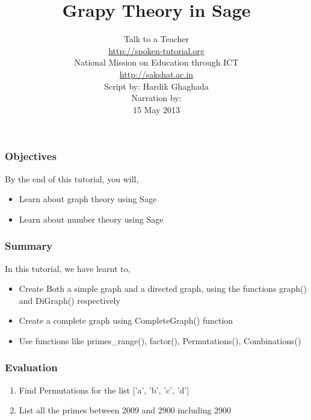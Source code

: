 \documentclass[17pt]{beamer}
\author[FOSSEE]{}
\institute[IIT Bombay]{}
\date[]{}
\begin{document}
\sffamily \bfseries
\title
[Graph Theory in Sage]
{Grapy Theory in Sage}
\author
[FOSSEE]
{\small Talk to a Teacher\\{\color{blue}\url{http://spoken-tutorial.org}}\\National Mission on Education
 through ICT\\{\color{blue}\url{http://sakshat.ac.in}} \\ [0.8cm]Script by: Hardik Ghaghada \\Narration by:  \\ [0.7cm]
{\small 15 May 2013}}

\begin{frame}
   \titlepage
\end{frame}
\begin{frame}
\frametitle{Objectives}
 By the end of this tutorial, you will,
\begin{itemize}
\item Learn about graph theory using Sage
\item Learn about number theory using Sage
\end{itemize}
\end{frame}
\begin{frame}
\frametitle{Summary}
In this tutorial, we have learnt to,  
\begin{itemize}
\item Create Both a simple graph and a directed graph, using the functions
graph() and DiGraph() respectively
\item Create a complete graph using CompleteGraph() function
\item Use functions like primes_range(), factor(), Permutations(),
Combinations()
\end{itemize}
\end{frame}
\begin{frame}
\frametitle{Evaluation}
\begin{enumerate}
\item Find  Permutations for the list ['a', 'b', 'c', 'd']
\item List all the primes between 2009 and 2900 including 2900
\end{enumerate}
\end{frame}
\end{document}
